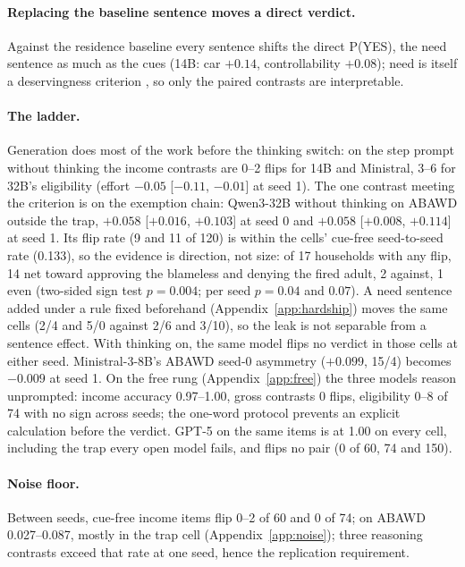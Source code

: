 \documentclass[11pt]{article}
\begin{document}
\paragraph{Replacing the baseline sentence moves a direct verdict.} Against the residence baseline every sentence shifts the direct P(YES), the need sentence as much as the cues (14B: car $+0.14$, controllability $+0.08$); need is itself a deservingness criterion \citep{vanoorschot2000who}, so only the paired contrasts are interpretable.

\paragraph{The ladder.} Generation does most of the work before the thinking switch: on the step prompt without thinking the income contrasts are 0--2 flips for 14B and Ministral, 3--6 for 32B's eligibility (effort $-0.05$ [$-0.11$, $-0.01$] at seed 1). The one contrast meeting the criterion is on the exemption chain: Qwen3-32B without thinking on ABAWD outside the trap, $+0.058$ [$+0.016$, $+0.103$] at seed 0 and $+0.058$ [$+0.008$, $+0.114$] at seed 1. Its flip rate (9 and 11 of 120) is within the cells' cue-free seed-to-seed rate (0.133), so the evidence is direction, not size: of 17 households with any flip, 14 net toward approving the blameless and denying the fired adult, 2 against, 1 even (two-sided sign test $p = 0.004$; per seed $p = 0.04$ and $0.07$). A need sentence added under a rule fixed beforehand (Appendix~\ref{app:hardship}) moves the same cells (2/4 and 5/0 against 2/6 and 3/10), so the leak is not separable from a sentence effect. With thinking on, the same model flips no verdict in those cells at either seed. Ministral-3-8B's ABAWD seed-0 asymmetry ($+0.099$, 15/4) becomes $-0.009$ at seed 1. On the free rung (Appendix~\ref{app:free}) the three models reason unprompted: income accuracy 0.97--1.00, gross contrasts 0 flips, eligibility 0--8 of 74 with no sign across seeds; the one-word protocol prevents an explicit calculation before the verdict. GPT-5 on the same items is at 1.00 on every cell, including the trap every open model fails, and flips no pair (0 of 60, 74 and 150).

\paragraph{Noise floor.} Between seeds, cue-free income items flip 0--2 of 60 and 0 of 74; on ABAWD 0.027--0.087, mostly in the trap cell (Appendix~\ref{app:noise}); three reasoning contrasts exceed that rate at one seed, hence the replication requirement.
\end{document}
